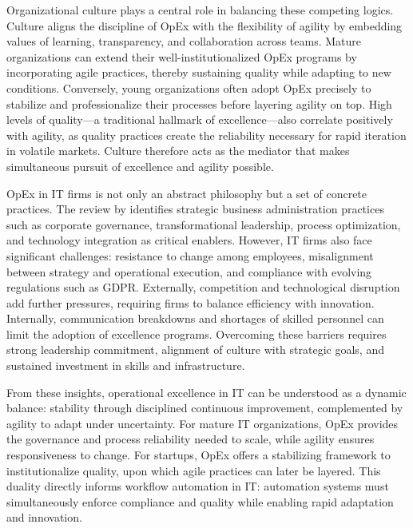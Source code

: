 Organizational culture plays a central role in balancing these competing logics. Culture aligns the discipline of OpEx with the flexibility of agility by embedding values of learning, transparency, and collaboration across teams. Mature organizations can extend their well-institutionalized OpEx programs by incorporating agile practices, thereby sustaining quality while adapting to new conditions. Conversely, young organizations often adopt OpEx precisely to stabilize and professionalize their processes before layering agility on top. High levels of quality---a traditional hallmark of excellence---also correlate positively with agility, as quality practices create the reliability necessary for rapid iteration in volatile markets. Culture therefore acts as the mediator that makes simultaneous pursuit of excellence and agility possible.

OpEx in IT firms is not only an abstract philosophy but a set of concrete practices. The review by \textcite{owoadeSystematic2024} identifies strategic business administration practices such as corporate governance, transformational leadership, process optimization, and technology integration as critical enablers. However, IT firms also face significant challenges: resistance to change among employees, misalignment between strategy and operational execution, and compliance with evolving regulations such as GDPR. Externally, competition and technological disruption add further pressures, requiring firms to balance efficiency with innovation. Internally, communication breakdowns and shortages of skilled personnel can limit the adoption of excellence programs. Overcoming these barriers requires strong leadership commitment, alignment of culture with strategic goals, and sustained investment in skills and infrastructure.

From these insights, operational excellence in IT can be understood as a dynamic balance: stability through disciplined continuous improvement, complemented by agility to adapt under uncertainty. For mature IT organizations, OpEx provides the governance and process reliability needed to scale, while agility ensures responsiveness to change. For startups, OpEx offers a stabilizing framework to institutionalize quality, upon which agile practices can later be layered. This duality directly informs workflow automation in IT: automation systems must simultaneously enforce compliance and quality while enabling rapid adaptation and innovation.

